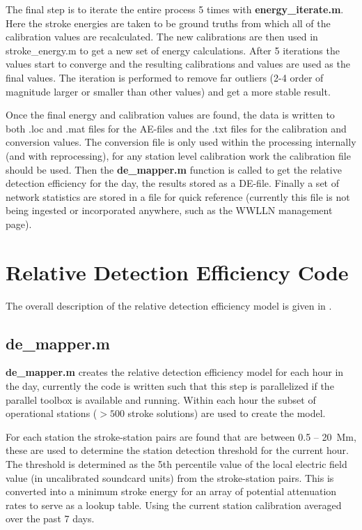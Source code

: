 The final step is to iterate the entire process 5 times with {\bf energy\_iterate.m}.
Here the stroke energies are taken to be ground truths from which all of the calibration values are recalculated.
The new calibrations are then used in stroke\_energy.m to get a new set of energy calculations.
After 5 iterations the values start to converge and the resulting calibrations and values are used as the final values.
The iteration is performed to remove far outliers (2-4 order of magnitude larger or smaller than other values) and get a more stable result.

Once the final energy and calibration values are found, the data is written to both .loc and .mat files for the AE-files and the .txt files for the calibration and conversion values.
The conversion file is only used within the processing internally (and with reprocessing), for any station level calibration work the calibration file should be used.
Then the {\bf de\_mapper.m} function is called to get the relative detection efficiency for the day, the results stored as a DE-file.
Finally a set of network statistics are stored in a file for quick reference (currently this file is not being ingested or incorporated anywhere, such as the WWLLN management page).

\section{Relative Detection Efficiency Code}

The overall description of the relative detection efficiency model is given in \citet{Hutchins2012a}.

\subsection{de\_mapper.m}

{\bf de\_mapper.m} creates the relative detection efficiency model for each hour in the day, currently the code is written such that this step is parallelized if the parallel toolbox is available and running.
Within each hour the subset of operational stations ($>500$ stroke solutions) are used to create the model.

For each station the stroke-station pairs are found that are between 0.5 -- 20~Mm, these are used to determine the station detection threshold for the current hour.
The threshold is determined as the 5th percentile value of the local electric field value (in uncalibrated soundcard units) from the stroke-station pairs.
This is converted into a minimum stroke energy for an array of potential attenuation rates to serve as a lookup table.
Using the current station calibration averaged over the past 7 days.


